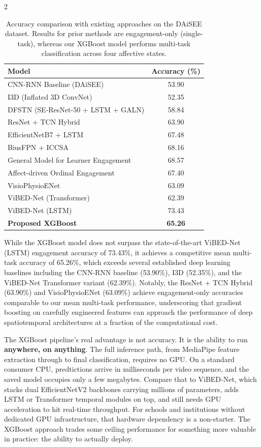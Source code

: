 \begin{multicols}{2}
  \begin{table}[H]
  \centering
  \caption{Accuracy comparison with existing approaches on the DAiSEE dataset. Results for prior methods are engagement-only (single-task), whereas our XGBoost model performs multi-task classification across four affective states\cite{Gothwal2025ViBEDNetVB}.}
  \label{tab:daisee-sota}
  \begin{tabular}{>{\small}l>{\small}c}
  \toprule
  \textbf{Model} & \textbf{Accuracy (\%)} \\
  \midrule
  CNN-RNN Baseline (DAiSEE) & 53.90 \\
  I3D (Inflated 3D ConvNet) & 52.35 \\
  DFSTN (SE-ResNet-50 + LSTM + GALN) & 58.84 \\
  ResNet + TCN Hybrid & 63.90 \\
  EfficientNetB7 + LSTM & 67.48 \\
  BiusFPN + ICCSA & 68.16 \\
  General Model for Learner Engagement & 68.57 \\
  Affect-driven Ordinal Engagement & 67.40 \\
  VisioPhysioENet & 63.09 \\
  ViBED-Net (Transformer) & 62.39 \\
  ViBED-Net (LSTM) & 73.43 \\
  \midrule
  \textbf{Proposed XGBoost } & \textbf{65.26} \\
  \bottomrule
  \end{tabular}
  \end{table}
  \vspace{-0.5cm}
  While the XGBoost model does not surpass the state-of-the-art ViBED-Net (LSTM) engagement accuracy of 73.43\%, it achieves a competitive mean multi-task accuracy of 65.26\%, which exceeds several established deep learning baselines including the CNN-RNN baseline (53.90\%), I3D (52.35\%), and the ViBED-Net Transformer variant (62.39\%). Notably, the ResNet + TCN Hybrid (63.90\%) and VisioPhysioENet (63.09\%) achieve engagement-only accuracies comparable to our mean multi-task performance, underscoring that gradient boosting on carefully engineered features can approach the performance of deep spatiotemporal architectures at a fraction of the computational cost.

  The XGBoost pipeline's real advantage is not accuracy. It is the ability to run \textbf{anywhere, on anything}. The full inference path, from MediaPipe feature extraction through to final classification, requires no GPU. On a standard consumer CPU, predtictions arrive in milliseconds per video sequence, and the saved model occupies only a few megabytes. Compare that to ViBED-Net, which stacks dual EfficientNetV2 backbones carrying millions of parameters, adds LSTM or Transformer temporal modules on top, and still needs GPU acceleration to hit real-time throughput. For schools and institutions without dedicated GPU infrastructure, that hardware dependency is a non-starter. The XGBoost approach trades some ceiling performance for something more valuable in practice: the ability to actually deploy.


\end{multicols}
